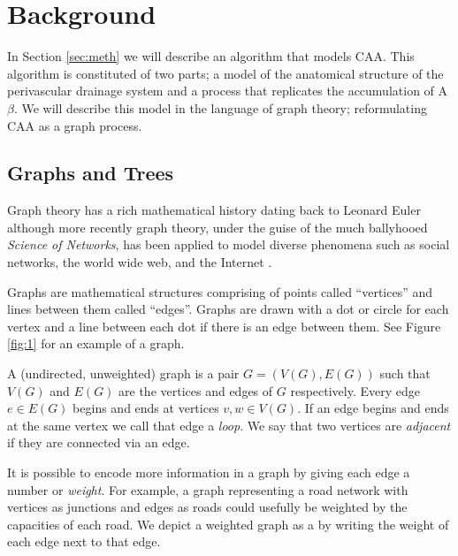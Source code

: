 \documentclass[10pt]{amsart} %
\theoremstyle{definition}
\begin{document}
\section{Background}

In Section \ref{sec:meth} we will describe an algorithm that models CAA.  This algorithm is constituted of two parts; a model of the anatomical structure of the perivascular drainage system and a process that replicates the accumulation of A$\beta$.  We will describe this model in the language of graph theory; reformulating CAA as a graph process.      

\subsection{Graphs and Trees}
Graph theory has a rich mathematical history dating back to Leonard Euler although more recently graph theory, under the guise of the much ballyhooed \emph{Science of Networks}, has been applied to model diverse phenomena such as social networks, the world wide web, and the Internet \cite{barabasi,bigg}.

Graphs are mathematical structures comprising of points called ``vertices'' and lines between them called ``edges''.  Graphs are drawn with a dot or circle for each vertex and a line between each dot if there is an edge between them.  See Figure \ref{fig:1} for an example of a graph.     

A (undirected, unweighted) graph is a pair $G = (V(G),E(G))$ such that $V(G)$ and $E(G)$ are the vertices and edges of $G$ respectively. Every edge $e \in E(G)$ begins and ends at vertices $ v,w \in V(G)$. If an edge begins and ends at the same vertex we call that edge a \emph{loop}.  We say that two vertices are \emph{adjacent} if they are connected via an edge.

It is possible to encode more information in a graph by giving each edge a number or \emph{weight}.  For example, a graph representing a road network with vertices as junctions and edges as roads could usefully be weighted by the capacities of each road.  We depict a weighted graph as a by writing the weight of each edge next to that edge.  
\end{document}
